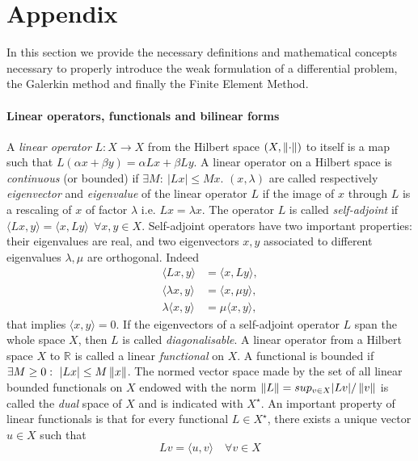 \section{Appendix}

In this section we provide the necessary definitions and mathematical concepts necessary to properly introduce the weak formulation of a differential problem, the Galerkin method and finally the Finite Element Method.\\

\paragraph{Linear operators, functionals and bilinear forms} A \textit{linear operator} $L: X\to X$ from the Hilbert space $(X, \left\lVert\cdot\right\rVert)$ to itself is a map such that $L(\alpha x + \beta y) = \alpha L x + \beta L y$. A linear operator on a Hilbert space is \textit{continuous} (or {bounded}) if $\exists M:\ |Lx|\leq Mx$. $(x, \lambda)$ are called respectively \textit{eigenvector} and \textit{eigenvalue} of the linear operator $L$ if the image of $x$ through $L$ is a rescaling of $x$ of factor $\lambda$ i.e. $Lx = \lambda x$. The operator $L$ is called \textit{self-adjoint} if $\langle Lx, y\rangle = \langle x,Ly\rangle\ \  \forall x,y \in X$. Self-adjoint operators have two important properties: their eigenvalues are real, and two eigenvectors $x, y$ associated to different eigenvalues $\lambda, \mu$ are orthogonal. Indeed 
\begin{align*}
	\langle Lx, y\rangle &= \langle x,Ly\rangle,\\
	\langle \lambda x, y\rangle &= \langle x,\mu y\rangle,\\
	\lambda \langle  x, y\rangle &= \mu \langle x, y\rangle,
\end{align*}
that implies $ \langle  x, y\rangle = 0$. If the eigenvectors of a self-adjoint operator $L$ span the whole space $X$, then $L$ is called \textit{diagonalisable}.  A linear operator from a Hilbert space $X$ to $\mathbb R$ is called a linear \textit{functional} on $X$. A functional is bounded if $\exists M\geq 0: \ |Lx|\leq M\norm x$. The normed vector space made by the set of all linear bounded functionals on $X$ endowed with the norm $\left\lVert L\right\rVert = sup_{v\in X}|Lv|/\left\lVert v\right\rVert$ is called the \textit{dual} space of $X$ and is indicated with $X^\star$. An important property of linear functionals is that for every functional $L\in X^\star$, there exists a unique vector $u\in X$ such that
$$Lv = \langle u, v\rangle\quad \forall v\in X$$ 

